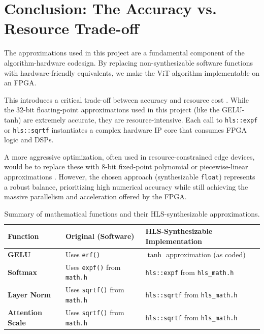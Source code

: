 \section{Conclusion: The Accuracy vs. Resource Trade-off}

The approximations used in this project are a fundamental component of the algorithm-hardware codesign. By replacing non-synthesizable software functions with hardware-friendly equivalents, we make the ViT algorithm implementable on an FPGA.

This introduces a critical trade-off between accuracy and resource cost \cite{ref7}. While the 32-bit floating-point approximations used in this project (like the GELU-tanh) are extremely accurate, they are resource-intensive. Each call to \texttt{hls::expf} or \texttt{hls::sqrtf} instantiates a complex hardware IP core that consumes FPGA logic and DSPs.

A more aggressive optimization, often used in resource-constrained edge devices, would be to replace these with 8-bit fixed-point polynomial or piecewise-linear approximations \cite{ref4, ref5}. However, the chosen approach (synthesizable \texttt{float}) represents a robust balance, prioritizing high numerical accuracy while still achieving the massive parallelism and acceleration offered by the FPGA.

\begin{table}[h!]
    \centering
    \begin{tabular}{|l|l|l|}
        \hline
        \textbf{Function} & \textbf{Original (Software)} & \textbf{HLS-Synthesizable Implementation} \\
        \hline
        \textbf{GELU} & Uses \texttt{erf()} & $\tanh$ approximation (as coded) \cite{ref6} \\
        \hline
        \textbf{Softmax} & Uses \texttt{expf()} from \texttt{math.h} & \texttt{hls::expf} from \texttt{hls\_math.h} \cite{ref4} \\
        \hline
        \textbf{Layer Norm} & Uses \texttt{sqrtf()} from \texttt{math.h} & \texttt{hls::sqrtf} from \texttt{hls\_math.h} \cite{ref4, ref5} \\
        \hline
        \textbf{Attention Scale} & Uses \texttt{sqrtf()} from \texttt{math.h} & \texttt{hls::sqrtf} from \texttt{hls\_math.h} \cite{ref4, ref5} \\
        \hline
    \end{tabular}
    \caption{Summary of mathematical functions and their HLS-synthesizable approximations.}
    \label{table:approx_summary}
\end{table}